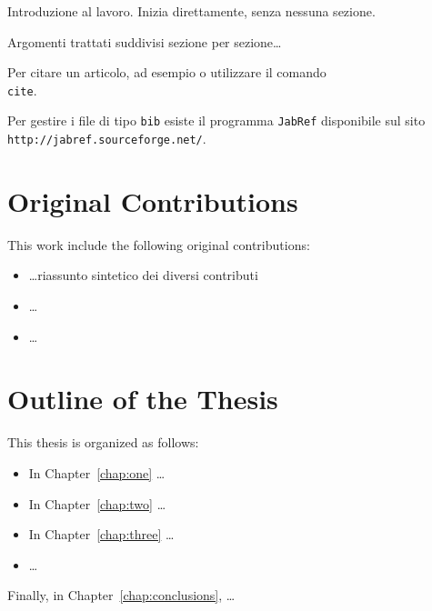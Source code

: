 Introduzione al lavoro. Inizia direttamente, senza nessuna sezione.

Argomenti trattati suddivisi sezione per sezione\dots

Per citare un articolo, ad esempio \cite{book:projpa2} o \cite{online:azuretable, online:datastore} utilizzare il comando \texttt{\\cite}. 

Per gestire i file di tipo \texttt{bib} esiste il programma \texttt{JabRef} disponibile sul sito \texttt{http://jabref.sourceforge.net/}.

\section*{Original Contributions}
This work include the following original contributions:
\begin{itemize}
\item \dots riassunto sintetico dei diversi contributi
\item \dots
\item \dots
\end{itemize}

\section*{Outline of the Thesis}
This thesis is organized as follows: 
\begin{itemize}
\item In Chapter~\ref{chap:one} \dots
\item In Chapter~\ref{chap:two} \dots
\item In Chapter~\ref{chap:three} \dots
\item \dots
\end{itemize}
Finally, in Chapter~\ref{chap:conclusions}, \dots


